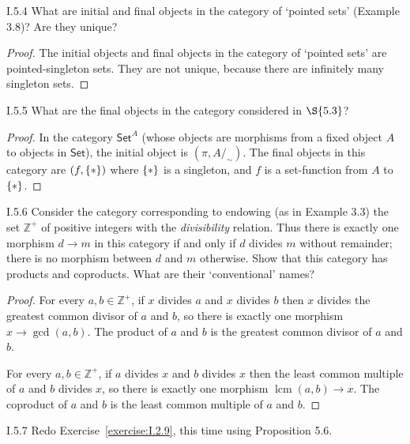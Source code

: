 \begin{exercise}{I.5.4}
	What are initial and final objects in the category of `pointed sets' (Example 3.8)? Are they unique?
\end{exercise}

\begin{proof}
	The initial objects and final objects in the category of `pointed sets' are pointed-singleton sets. They are not unique, because there are infinitely many singleton sets.
\end{proof}

\begin{exercise}{I.5.5}
	What are the final objects in the category considered in $\S{5.3}$?
\end{exercise}

\begin{proof}
	In the category $\mathsf{Set}^{A}$ (whose objects are morphisms from a fixed object $A$ to objects in $\mathsf{Set}$), the initial object is $(\pi, A/_{\sim})$. The final objects in this category are $(f, \left\{{*}\right\})$ where $\left\{{*}\right\}$ is a singleton, and $f$ is a set-function from $A$ to $\left\{{*}\right\}$.
\end{proof}

\begin{exercise}{I.5.6}
	Consider the category corresponding to endowing (as in Example 3.3) the set $\mathbb{Z}^{+}$ of positive integers with the \textit{divisibility} relation. Thus there is exactly one morphism $d\to m$ in this category if and only if $d$ divides $m$ without remainder; there is no morphism between $d$ and $m$ otherwise. Show that this category has products and coproducts. What are their `conventional' names?
\end{exercise}

\begin{proof}
	For every $a, b \in \mathbb{Z}^{+}$, if $x$ divides $a$ and $x$ divides $b$ then $x$ divides the greatest common divisor of $a$ and $b$, so there is exactly one morphism $x\to \gcd(a, b)$. The product of $a$ and $b$ is the greatest common divisor of $a$ and $b$.

	For every $a, b \in \mathbb{Z}^{+}$, if $a$ divides $x$ and $b$ divides $x$ then the least common multiple of $a$ and $b$ divides $x$, so there is exactly one morphism $\operatorname{lcm}(a, b)\to x$. The coproduct of $a$ and $b$ is the least common multiple of $a$ and $b$.
\end{proof}

\begin{exercise}{I.5.7}
	Redo Exercise~\ref{exercise:I.2.9}, this time using Proposition 5.6.
\end{exercise}

